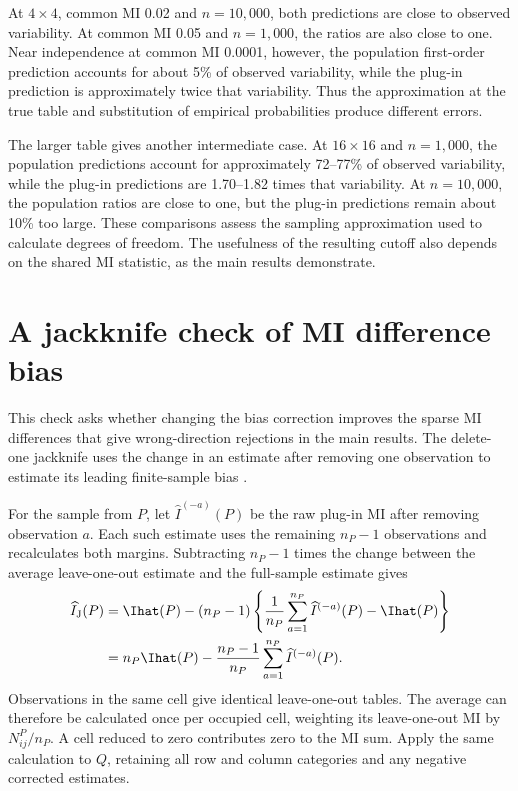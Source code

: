 \begin{table}[H]
\centering
\small
\caption{Predicted and observed variability of the estimated MI variance.}
\label{tab:variance-stability}

\end{table}

At \(4\times4\), common MI 0.02 and \(n=10{,}000\), both
predictions are close to observed variability. At common MI 0.05 and
\(n=1{,}000\), the ratios are also close to one. Near independence
at common MI 0.0001, however, the population first-order prediction
accounts for about 5\% of observed variability, while the plug-in
prediction is approximately twice that variability. Thus the
approximation at the true table and substitution of empirical
probabilities produce different errors.

The larger table gives another intermediate case. At \(16\times16\)
and \(n=1{,}000\), the population predictions account for approximately
72--77\% of observed variability, while the plug-in predictions are
1.70--1.82 times that variability. At \(n=10{,}000\), the population
ratios are close to one, but the plug-in predictions remain about 10\%
too large. These comparisons assess the sampling approximation used to
calculate degrees of freedom. The usefulness of the resulting cutoff
also depends on the shared MI statistic, as the main results demonstrate.

\section{A jackknife check of MI difference bias}
\label{sec:jackknife-difference-check}

This check asks whether changing the bias correction improves the sparse
MI differences that give wrong-direction rejections in the main results.
The delete-one jackknife uses the change in an estimate after removing
one observation to estimate its leading finite-sample bias
\citep[Section~3]{paninski2003}.

For the sample from \(P\), let
\(\widehat I^{(-a)}(P)\) be the raw plug-in MI after removing observation
\(a\). Each such estimate uses the remaining \(n_P-1\) observations and
recalculates both margins. Subtracting \(n_P-1\) times the change between
the average leave-one-out estimate and the full-sample estimate gives
\begin{align}
 \widehat I_{\mathrm J}(P)
 &=\Ihat(P)-(n_P-1)
 \left\{\frac{1}{n_P}\sum_{a=1}^{n_P}\widehat I^{(-a)}(P)-\Ihat(P)\right\}
 \notag\\
 &=n_P\Ihat(P)-\frac{n_P-1}{n_P}
 \sum_{a=1}^{n_P}\widehat I^{(-a)}(P).
 \label{eq:jackknife-mi-check}
\end{align}
Observations in the same cell give identical leave-one-out tables. The
average can therefore be calculated once per occupied cell, weighting its
leave-one-out MI by \(N^P_{ij}/n_P\). A cell reduced to zero contributes
zero to the MI sum. Apply the same calculation to \(Q\), retaining
all row and column categories and any negative corrected estimates.

